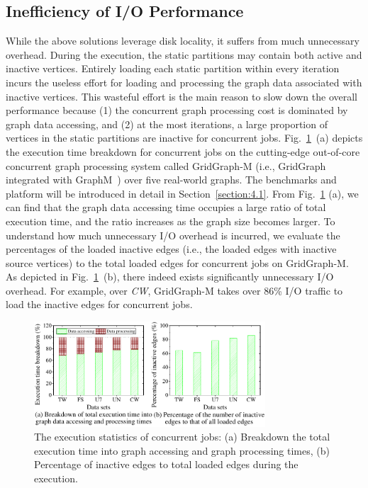 \documentclass[10pt,journal,compsoc]{IEEEtran}
\begin{document}
\vspace{-10pt}
\subsection{Inefficiency of I/O Performance}
\vspace{-2pt}
While the above solutions leverage disk locality, it suffers from much unnecessary overhead. During the execution, the static partitions may contain both active and inactive vertices.
Entirely loading each static partition within every iteration incurs the useless effort for loading and processing the graph data associated with inactive vertices. This wasteful effort is the main reason to slow down the overall performance because (1) the concurrent graph processing cost is dominated by graph data accessing, and (2) at the most iterations, a large proportion of vertices in the static partitions are inactive for concurrent jobs.
Fig.~\ref{IO_inefficient}~(a) depicts the execution time breakdown for concurrent jobs on the cutting-edge out-of-core concurrent graph processing system called GridGraph-M (i.e., GridGraph~\cite{GridGraph} integrated with GraphM~\cite{GraphM}) over five real-world graphs. The benchmarks and platform will be introduced in detail in Section~\ref{section:4.1}. From Fig.~\ref{IO_inefficient} (a), we can find that the graph data accessing time occupies a large ratio of total execution time, and the ratio increases as the graph size becomes larger.
To understand how much unnecessary I/O overhead is incurred, we evaluate the percentages of the loaded inactive edges (i.e., the loaded edges with inactive source vertices) to the total loaded edges for concurrent jobs on GridGraph-M. As depicted in Fig.~\ref{IO_inefficient}~(b), there indeed exists significantly unnecessary I/O overhead. For example, over \textit{CW}, GridGraph-M takes over 86\% I/O traffic to load the inactive edges for concurrent jobs.

\begin{figure}[!t]
	\centering
	\includegraphics[width=3.4in]{IO_inefficient.pdf}
	\vspace{-12pt}
	\caption{The execution statistics of concurrent jobs: (a) Breakdown the total execution time into graph accessing and graph processing times, (b) Percentage of inactive edges to total loaded edges during the execution.}
	\label{IO_inefficient}
	\vspace{-12pt}
\end{figure}
\end{document}
